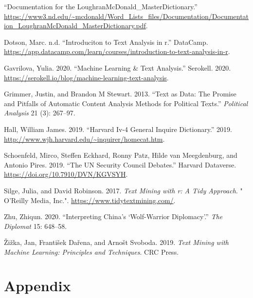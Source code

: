 \documentclass[
]{article}
\newlength{\cslhangindent}
\newlength{\cslentryspacingunit} %
\newenvironment{CSLReferences}[2] %
 {%
  \setlength{\parindent}{0pt}
  \ifodd #1
  \let\oldpar\par
  \def\par{\hangindent=\cslhangindent\oldpar}
  \fi
  \setlength{\parskip}{#2\cslentryspacingunit}
 }%
 {}
\begin{document}
\hypertarget{refs}{}
\begin{CSLReferences}{1}{0}
\leavevmode{}%
{``Documentation for the LoughranMcDonald\_MasterDictionary.''}
\url{https://www3.nd.edu/~mcdonald/Word_Lists_files/Documentation/Documentation_LoughranMcDonald_MasterDictionary.pdf}.

\leavevmode{}%
Dotson, Marc. n.d. {``Introduciton to Text Analysis in r.''} DataCamp.
\url{https://app.datacamp.com/learn/courses/introduction-to-text-analysis-in-r}.

\leavevmode{}%
Gavrilova, Yulia. 2020. {``Machine Learning \& Text Analysis.''}
Serokell. 2020.
\url{https://serokell.io/blog/machine-learning-text-analysis}.

\leavevmode{}%
Grimmer, Justin, and Brandon M Stewart. 2013. {``Text as Data: The
Promise and Pitfalls of Automatic Content Analysis Methods for Political
Texts.''} \emph{Political Analysis} 21 (3): 267--97.

\leavevmode{}%
Hall, William James. 2019. {``Harvard Iv-4 General Inquire
Dictionary.''} 2019.
\url{http://www.wjh.harvard.edu/~inquirer/homecat.htm}.

\leavevmode{}%
Schoenfeld, Mirco, Steffen Eckhard, Ronny Patz, Hilde van Meegdenburg,
and Antonio Pires. 2019. {``{The UN Security Council Debates}.''}
Harvard Dataverse. \url{https://doi.org/10.7910/DVN/KGVSYH}.

\leavevmode{}%
Silge, Julia, and David Robinson. 2017. \emph{Text Mining with r: A Tidy
Approach}. " O'Reilly Media, Inc.".
\url{https://www.tidytextmining.com/}.

\leavevmode{}%
Zhu, Zhiqun. 2020. {``Interpreting China's {`Wolf-Warrior
Diplomacy'}.''} \emph{The Diplomat} 15: 648--58.

\leavevmode{}%
Žižka, Jan, František Dařena, and Arnošt Svoboda. 2019. \emph{Text
Mining with Machine Learning: Principles and Techniques}. CRC Press.

\end{CSLReferences}

\hypertarget{appendix}{%
\section*{Appendix}\label{appendix}}
\end{document}
